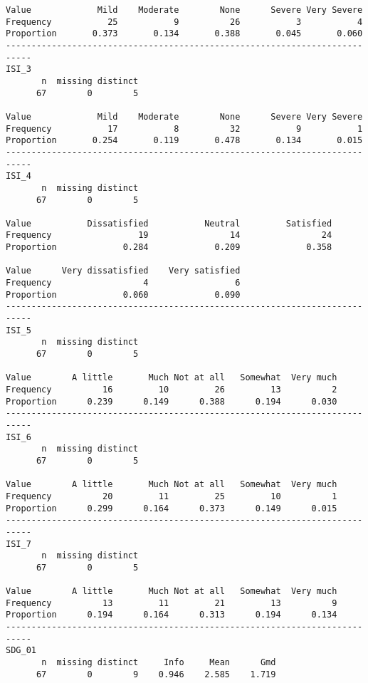\documentclass[]{article}
\begin{document}
\begin{verbatim}
Value             Mild    Moderate        None      Severe Very Severe
Frequency           25           9          26           3           4
Proportion       0.373       0.134       0.388       0.045       0.060
---------------------------------------------------------------------------
ISI_3 
       n  missing distinct 
      67        0        5 
                                                                      
Value             Mild    Moderate        None      Severe Very Severe
Frequency           17           8          32           9           1
Proportion       0.254       0.119       0.478       0.134       0.015
---------------------------------------------------------------------------
ISI_4 
       n  missing distinct 
      67        0        5 
                                                                
Value           Dissatisfied           Neutral         Satisfied
Frequency                 19                14                24
Proportion             0.284             0.209             0.358
                                              
Value      Very dissatisfied    Very satisfied
Frequency                  4                 6
Proportion             0.060             0.090
---------------------------------------------------------------------------
ISI_5 
       n  missing distinct 
      67        0        5 
                                                                 
Value        A little       Much Not at all   Somewhat  Very much
Frequency          16         10         26         13          2
Proportion      0.239      0.149      0.388      0.194      0.030
---------------------------------------------------------------------------
ISI_6 
       n  missing distinct 
      67        0        5 
                                                                 
Value        A little       Much Not at all   Somewhat  Very much
Frequency          20         11         25         10          1
Proportion      0.299      0.164      0.373      0.149      0.015
---------------------------------------------------------------------------
ISI_7 
       n  missing distinct 
      67        0        5 
                                                                 
Value        A little       Much Not at all   Somewhat  Very much
Frequency          13         11         21         13          9
Proportion      0.194      0.164      0.313      0.194      0.134
---------------------------------------------------------------------------
SDG_01 
       n  missing distinct     Info     Mean      Gmd 
      67        0        9    0.946    2.585    1.719 
                                                                

\end{verbatim}
\end{document}
